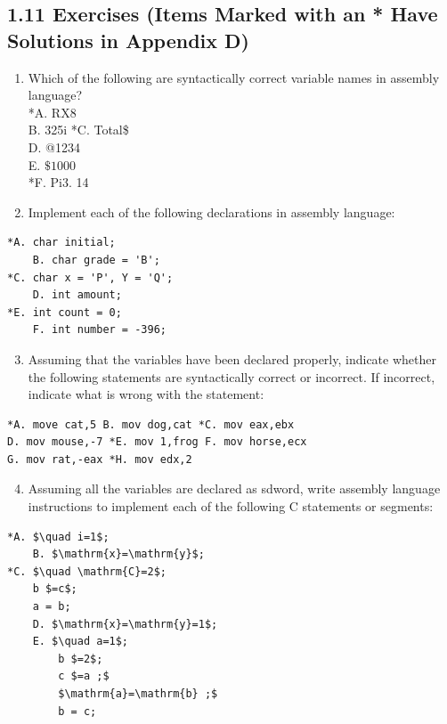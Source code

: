 \documentclass[10pt]{article}
\begin{document}
\subsection*{1.11 Exercises (Items Marked with an * Have Solutions in Appendix D)}
\begin{enumerate}
  \item Which of the following are syntactically correct variable names in assembly language?\\
*A. RX8\\
B. 325i *C. Total\$\\
D. @1234\\
E. $\$ 1000$\\
*F. Pi3. 14
  \item Implement each of the following declarations in assembly language:
\end{enumerate}

\begin{verbatim}
*A. char initial;
    B. char grade = 'B';
*C. char x = 'P', Y = 'Q';
    D. int amount;
*E. int count = 0;
    F. int number = -396;
\end{verbatim}

\begin{enumerate}
  \setcounter{enumi}{2}
  \item Assuming that the variables have been declared properly, indicate whether the following statements are syntactically correct or incorrect. If incorrect, indicate what is wrong with the statement:
\end{enumerate}

\begin{verbatim}
*A. move cat,5 B. mov dog,cat *C. mov eax,ebx
D. mov mouse,-7 *E. mov 1,frog F. mov horse,ecx
G. mov rat,-eax *H. mov edx,2
\end{verbatim}

\begin{enumerate}
  \setcounter{enumi}{3}
  \item Assuming all the variables are declared as sdword, write assembly language instructions to implement each of the following C statements or segments:
\end{enumerate}

\begin{verbatim}
*A. $\quad i=1$;
    B. $\mathrm{x}=\mathrm{y}$;
*C. $\quad \mathrm{C}=2$;
    b $=c$;
    a = b;
    D. $\mathrm{x}=\mathrm{y}=1$;
    E. $\quad a=1$;
        b $=2$;
        c $=a ;$
        $\mathrm{a}=\mathrm{b} ;$
        b = c;
\end{verbatim}
\end{document}
